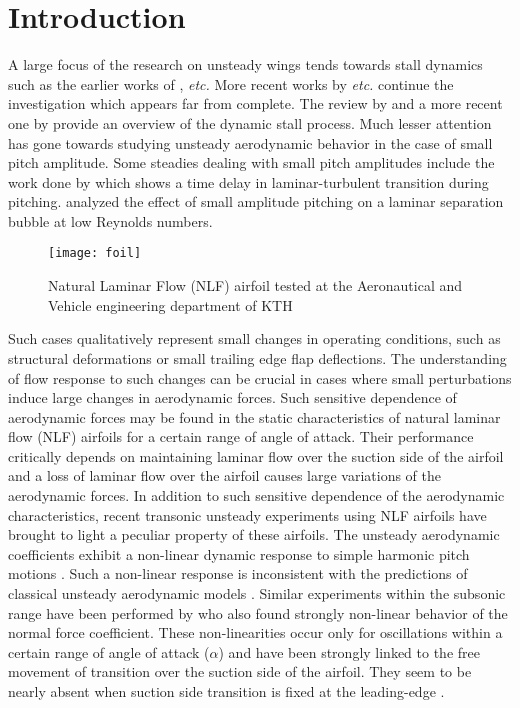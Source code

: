 

\section{Introduction}

A large focus of the research on unsteady wings tends towards stall dynamics such as the earlier works of \cite{mccroskey81,mccroskey82experimental,mccroskey73,mccroskey76,carr1977,ericsson_stall88a,ericsson_stall88b}, \emph{etc.} More recent works by \cite{dunne2015,rival2010,choudhry14,visbal11,visbal14,visbal17,alferez13,rosti16} \emph{etc.} continue the investigation which appears far from complete. The review by \cite{mccroskey82} and a more recent one by \cite{coorke15} provide an overview of the dynamic stall process. Much lesser attention has gone towards studying unsteady aerodynamic behavior in the case of small pitch amplitude. Some steadies dealing with small pitch amplitudes include the work done by \cite{pascazio96} which shows a time delay in laminar-turbulent transition during pitching. \cite{nati15} analyzed the effect of small amplitude pitching on a laminar separation bubble at low Reynolds numbers.
\begin{figure}[h]
	\centering
	\texttt{[image: foil]}
	\caption{Natural Laminar Flow (NLF) airfoil tested at the Aeronautical and Vehicle engineering department of KTH \citep{lokatt17,lokattthesis}}
	\label{fig:foil_david}
\end{figure}
Such cases qualitatively represent small changes in operating conditions, such as structural deformations or small trailing edge flap deflections. The understanding of flow response to such changes can be crucial in cases where small perturbations induce large changes in aerodynamic forces. Such sensitive dependence of aerodynamic forces may be found in the static characteristics of natural laminar flow (NLF) airfoils for a certain range of angle of attack. Their performance critically depends on maintaining laminar flow over the suction side of the airfoil and a loss of laminar flow over the airfoil causes large variations of the aerodynamic forces. In addition to such sensitive dependence of the aerodynamic characteristics, recent transonic unsteady experiments using NLF airfoils have brought to light a peculiar property of these airfoils. The unsteady aerodynamic coefficients exhibit a non-linear dynamic response to simple harmonic pitch motions \cite{mai11,hebler13}. Such a non-linear response is inconsistent with the predictions of classical unsteady aerodynamic models \citep{theodorsen35}. Similar experiments within the subsonic range have been performed by \cite{lokattthesis} who also found strongly non-linear behavior of the normal force coefficient. These non-linearities occur only for oscillations within a certain range of angle of attack ($\alpha$) and have been strongly linked to the free movement of transition over the suction side of the airfoil. They seem to be nearly absent when suction side transition is fixed at the leading-edge \citep{mai11,lokattthesis}. 


